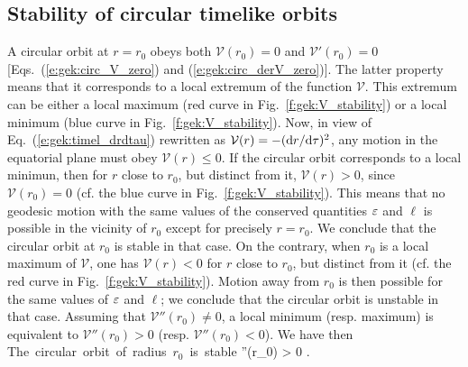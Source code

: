 \subsection{Stability of circular timelike orbits}

A circular orbit at $r=r_0$ obeys both $\mathcal{V}(r_0) = 0$ and $\mathcal{V}'(r_0) = 0$
[Eqs.~(\ref{e:gek:circ_V_zero}) and (\ref{e:gek:circ_derV_zero})]. The latter property means that
it corresponds to a local extremum of the function $\mathcal{V}$. This extremum can be either
a local maximum (red curve in Fig.~\ref{f:gek:V_stability}) or a local minimum
(blue curve in Fig.~\ref{f:gek:V_stability}).
Now, in view of Eq.~(\ref{e:gek:timel_drdtau}) rewritten as $\mathcal{V}(r) = - (\mathrm{d} r/ \mathrm{d}\tau)^2$, any motion in the equatorial plane must obey $\mathcal{V}(r) \leq 0$. If the circular orbit
corresponds to a local minimun, then for $r$ close to $r_0$, but distinct from it,
$\mathcal{V}(r) > 0$, since $\mathcal{V}(r_0) = 0$ (cf. the blue curve in Fig.~\ref{f:gek:V_stability}). This means that no geodesic motion with the same values of the
conserved quantities $\varepsilon$ and $\ell$
is possible in the vicinity of $r_0$ except for precisely $r=r_0$. We conclude that the circular orbit at $r_0$ is stable in that case.
On the contrary, when $r_0$ is a local maximum of $\mathcal{V}$, one has
$\mathcal{V}(r) < 0$
for $r$ close to $r_0$, but distinct from it (cf. the red curve in Fig.~\ref{f:gek:V_stability}).
Motion away from $r_0$ is then possible for the same values of $\varepsilon$ and $\ell$; we conclude that the circular orbit is unstable in that
case. Assuming that $\mathcal{V}''(r_0)\neq 0$, a local minimum (resp. maximum) is equivalent to
$\mathcal{V}''(r_0) > 0$ (resp. $\mathcal{V}''(r_0) < 0$). We have then
\be \label{e:gek:stability_circ_V}
    \mbox{The circular orbit of radius $r_0$ is stable} \iff
    ''(r_0) > 0 .
\ee

